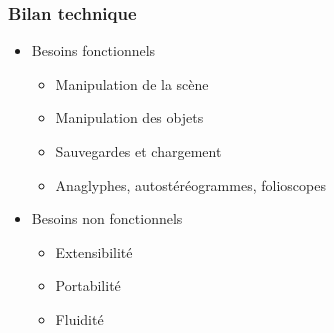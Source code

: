 \documentclass{beamer}
\begin{document}

\begin{frame}
\frametitle{Bilan technique}
\begin{itemize}[label=$\bullet$]
\item Besoins fonctionnels
	\begin{itemize}[label=$\checkmark$]
	\item Manipulation de la scène
	\item Manipulation des objets
	\item Sauvegardes et chargement
	\item Anaglyphes, autostéréogrammes, folioscopes

	\end{itemize}
\item Besoins non fonctionnels
	\begin{itemize}[label=$\checkmark$]
	\item Extensibilité
	\item Portabilité  
	\item Fluidité
	\end{itemize}
\end{itemize}

\end{frame}

\end{document}
